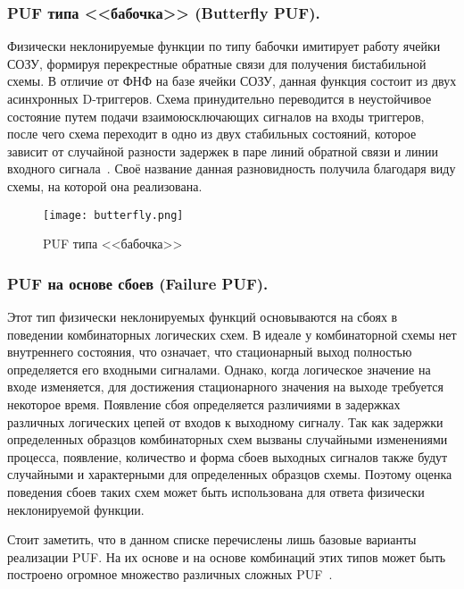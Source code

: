 \begin{enumerate}
\subsubsection{PUF типа <<бабочка>> (Butterfly PUF). }
\label{sub:domain:puf_types:butterfly}
Физически неклонируемые функции по типу бабочки имитирует работу ячейки СОЗУ, формируя перекрестные обратные связи для получения бистабильной схемы. В отличие от ФНФ на базе ячейки СОЗУ, данная функция состоит из двух асинхронных D-триггеров. Схема принудительно переводится в неустойчивое состояние путем подачи взаимоюсключающих сигналов на входы триггеров, после чего схема переходит в одно из двух стабильных состояний, которое зависит от случайной разности задержек в паре линий обратной связи и линии входного сигнала~\cite{yarmolik_vashinko}. Своё название данная разновидность получила благодаря виду схемы, на которой она реализована.
\begin{figure}[ht]
    \centering
    \label{fig:domain:puf_types:butterfly}
    \texttt{[image: butterfly.png]}
    \caption{PUF типа <<бабочка>>}
\end{figure}


\subsubsection{PUF на основе сбоев (Failure PUF). }
\label{sub:domain:puf_types:failure_puf}

Этот тип физически неклонируемых функций основываются на сбоях в поведении комбинаторных логических схем. В идеале у комбинаторной схемы нет внутреннего состояния, что означает, что стационарный выход полностью определяется его входными сигналами. Однако, когда логическое значение на входе изменяется, для достижения стационарного значения на выходе требуется некоторое время. Появление сбоя определяется различиями в задержках различных логических цепей от входов к выходному сигналу. Так как задержки определенных образцов комбинаторных схем вызваны случайными изменениями процесса, появление, количество и форма сбоев выходных сигналов также будут случайными и характерными для определенных образцов схемы. Поэтому оценка поведения сбоев таких схем может быть использована для ответа физически неклонируемой функции.

Стоит заметить, что в данном списке перечислены лишь базовые варианты реализации PUF. На их основе и на основе комбинаций этих типов может быть построено огромное множество различных сложных PUF~\cite{cryptowiki_pufs, rmaes_pufs}.



\end{enumerate}
